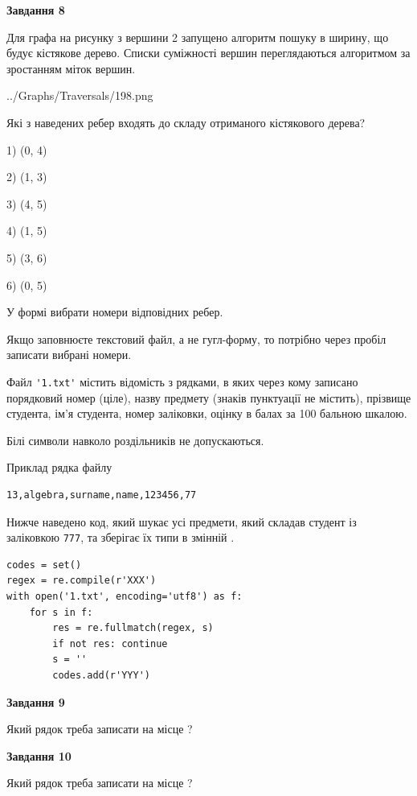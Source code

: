 \documentclass[12pt, ukrainian]{article}
\def\code#1{\Verb!#1!}
\begin{document}
{\begin {large}
{\begin {center}\textbf{Завдання 8}\end {center}}\par
Для графа на рисунку з вершини 2 запущено алгоритм пошуку в ширину, що будує кістякове дерево. Списки суміжності вершин переглядаються алгоритмом за зростанням міток вершин.\par
\begin{center}
	{../Graphs/Traversals/198.png}
\end{center}
\par Які з наведених ребер входять до складу отриманого кістякового дерева?\par
1) (0, 4)\par
2) (1, 3)\par
3) (4, 5)\par
4) (1, 5)\par
5) (3, 6)\par
6) (0, 5)\par
{\vskip 15pt} У формі вибрати номери відповідних ребер.


Якщо заповнюєте текстовий файл, а не гугл-форму, то потрібно через пробіл записа\-ти вибрані номери.\par
\newpage


Файл \code{'1.txt'} містить відомість з рядками, в яких через кому записано поряд\-ковий номер (ціле), назву предмету (знаків пунктуації не містить), прізвище студента, ім'я студента, номер заліковки, оцінку в балах за 100 бальною шкалою.

Білі символи навколо роздільників не допускаються.

Приклад рядка файлу



\begin{verbatim}
13,algebra,surname,name,123456,77
\end{verbatim}


Нижче наведено код, який шукає усі предмети, який складав студент із заліковкою \code{777}, та зберігає їх типи в змінній .



\begin{verbatim}
codes = set()
regex = re.compile(r'XXX')
with open('1.txt', encoding='utf8') as f:
    for s in f:
        res = re.fullmatch(regex, s)
        if not res: continue
        s = ''
        codes.add(r'YYY')
\end{verbatim}


{\begin {center}\textbf{Завдання 9}\end {center}}\par
Який рядок треба записати на місце  ?\par
\vspace{5mm}


{\begin {center}\textbf{Завдання 10}\end {center}}\par
Який рядок треба записати на місце  ?\par


\newpage


\end {large}}
\end{document}
